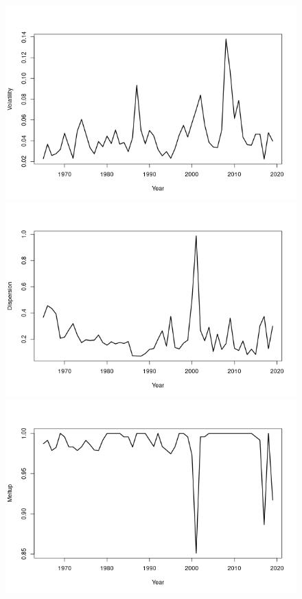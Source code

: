 \documentclass[leqno,12pt]{article}
\begin{document}
{\begin{figure}[htp]
\begin{center}
  \includegraphics[scale=0.33]{img/plot1}
  \includegraphics[scale=0.33]{img/plot2}
  \includegraphics[scale=0.33]{img/plot3}

\end{center}
\end{figure}}
\end{document}
